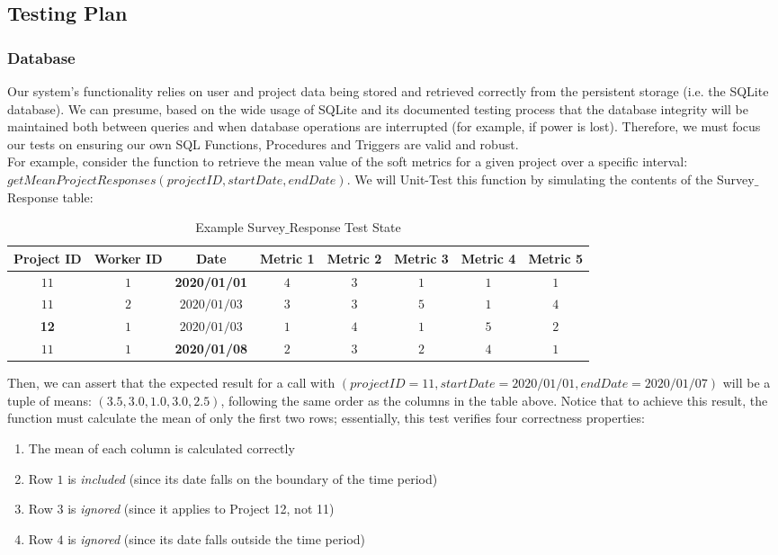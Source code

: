 \documentclass[a4paper]{article}
\theoremstyle{plain}
\theoremstyle{definition}
\theoremstyle{remark}
\begin{document}
\subsection*{Testing Plan}
\subsubsection*{Database}
Our system’s functionality relies on user and project data being stored and retrieved correctly from the persistent storage (i.e. the SQLite database). We can presume, based on the wide usage of SQLite and its documented testing process \cite{sqlite} that the database integrity will be maintained both between queries and when database operations are interrupted (for example, if power is lost). Therefore, we must focus our tests on ensuring our own SQL Functions, Procedures and Triggers are valid and robust. \\

\noindent For example, consider the function to retrieve the mean value of the soft metrics for a given project over a specific interval: $getMeanProjectResponses(projectID, startDate, endDate)$. We will Unit-Test this function by simulating the contents of the Survey$\_$Response table:
\begin{table}[H]
	\centering
	\caption{Example Survey$\_$Response Test State}
	\label{tab:label}
	\begin{tabular}{|c|c|c|c|c|c|c|c|}
		\hline
		\textbf{Project ID} & \textbf{Worker ID} & \textbf{Date} & \textbf{Metric 1} & \textbf{Metric 2} & \textbf{Metric 3} & \textbf{Metric 4} & \textbf{Metric 5} \\
		\hline
		$11$ & $1 $ &\textbf{ 2020/01/01 }& $4$ & $3$ & $1 $ & $1$ & $1$ \\
		\hline
		$11$ & $2$ & $2020 / 01 / 03$ & $3$ & $3$ & $5$ & $1 $ & $4$ \\
		\hline
		\textbf{12} & $1$ & $2020 / 01 / 03$ & $1$ & $4 $ & $1$ & $5$ & $2$ \\
		\hline
		$11$ & $1 $ & \textbf{2020/01/08} & $2$ & $3$ & $2$ & $4 $ &$1$ \\
		\hline
	\end{tabular}
\end{table}
\noindent Then, we can assert that the expected result for a call with $(projectID=11, startDate=2020/01/01, endDate=2020/01/07)$ will be a tuple of means: $(3.5, 3.0, 1.0, 3.0, 2.5)$, following the same order as the columns in the table above. Notice that to achieve this result, the function must calculate the mean of only the first two rows; essentially, this test verifies four correctness properties:
\begin{enumerate}
	\item The mean of each column is calculated correctly
	\item Row $1$ is \textit{included} (since its date falls on the boundary of the time period)
	\item Row $3$ is \textit{ignored} (since it applies to Project 12, not 11)
	\item Row $4$ is \textit{ignored} (since its date falls outside the time period)
\end{enumerate}
\end{document}
